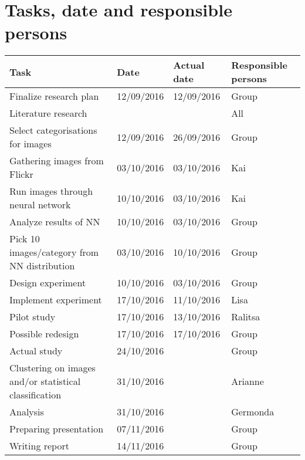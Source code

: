 \documentclass[11pt,a4paper,oneside]{article}
\begin{document}
\section{Tasks, date and responsible persons}
\begin{tabular}{p{5.75cm} p{2.85cm} p{2.85cm} l}
Task & Date & Actual date & Responsible persons \\
\hline
\hline
Finalize research plan & 12/09/2016 & 12/09/2016 & Group \\
\hline
Literature research & & & All \\
\hline
Select categorisations for images & 12/09/2016 & 26/09/2016 & Group \\
\hline
Gathering images from Flickr & 03/10/2016 & 03/10/2016 & Kai\\
\hline
Run images through neural network & 10/10/2016 & 03/10/2016 & Kai \\
\hline
Analyze results of NN & 10/10/2016 & 03/10/2016 & Group\\
\hline
Pick 10 images/category from NN distribution & 03/10/2016 & 10/10/2016 & Group \\
\hline
Design experiment & 10/10/2016 & 03/10/2016 & Group\\
\hline
Implement experiment & 17/10/2016 & 11/10/2016 & Lisa \\
\hline
Pilot study & 17/10/2016 & 13/10/2016 & Ralitsa \\
\hline
Possible redesign & 17/10/2016 & 17/10/2016 & Group \\
\hline
Actual study & 24/10/2016 & & Group\\
\hline
Clustering on images and/or statistical classification & 31/10/2016 & & Arianne \\
\hline
Analysis & 31/10/2016 & & Germonda \\
\hline
Preparing presentation & 07/11/2016 & & Group\\
\hline
Writing report & 14/11/2016 & & Group \\
\hline
\end{tabular}
\end{document}
